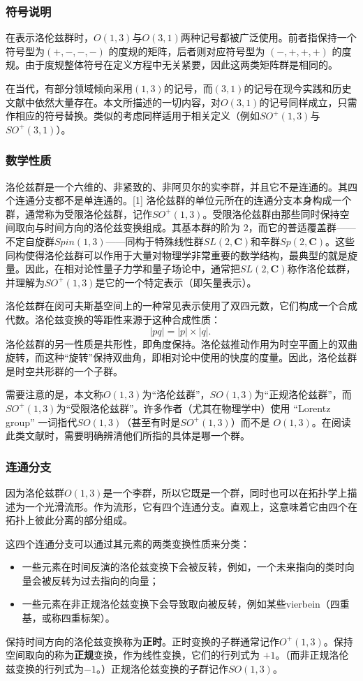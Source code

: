 \subsubsection{符号说明}
在表示洛伦兹群时，$O(1,3)$与$O(3,1)$两种记号都被广泛使用。前者指保持一个符号型为$(+,-,-,-)$ 的度规的矩阵，后者则对应符号型为 $(-,+,+,+)$ 的度规。由于度规整体符号在定义方程中无关紧要，因此这两类矩阵群是相同的。

在当代，有部分领域倾向采用$(1,3)$的记号，而$(3,1)$的记号在现今实践和历史文献中依然大量存在。本文所描述的一切内容，对$O(3,1)$的记号同样成立，只需作相应的符号替换。类似的考虑同样适用于相关定义（例如$SO^{+}(1,3)$与$SO^{+}(3,1)$）。
\subsubsection{数学性质}
洛伦兹群是一个六维的、非紧致的、非阿贝尔的实李群，并且它不是连通的。其四个连通分支都不是单连通的。[1] 洛伦兹群的单位元所在的连通分支本身构成一个群，通常称为受限洛伦兹群，记作$SO^{+}(1,3)$。受限洛伦兹群由那些同时保持空间取向与时间方向的洛伦兹变换组成。其基本群的阶为 2，而它的普适覆盖群——不定自旋群$Spin(1,3)$——同构于特殊线性群$SL(2,\mathbf{C})$和辛群$Sp(2,\mathbf{C})$。这些同构使得洛伦兹群可以作用于大量对物理学非常重要的数学结构，最典型的就是旋量。因此，在相对论性量子力学和量子场论中，通常把$SL(2,\mathbf{C})$称作洛伦兹群，并理解为$SO^{+}(1,3)$是它的一个特定表示（即矢量表示）。

洛伦兹群在闵可夫斯基空间上的一种常见表示使用了双四元数，它们构成一个合成代数。洛伦兹变换的等距性来源于这种合成性质：
\[
|pq| = |p| \times |q|.~
\]
洛伦兹群的另一性质是共形性，即角度保持。洛伦兹推动作用为时空平面上的双曲旋转，而这种“旋转”保持双曲角，即相对论中使用的快度的度量。因此，洛伦兹群是时空共形群的一个子群。

需要注意的是，本文称$O(1,3)$为“洛伦兹群”，$SO(1,3)$为“正规洛伦兹群”，而 $SO^{+}(1,3)$为“受限洛伦兹群”。许多作者（尤其在物理学中）使用 “Lorentz group” 一词指代$SO(1,3)$（甚至有时是$SO^{+}(1,3)$）而不是 $O(1,3)$。在阅读此类文献时，需要明确辨清他们所指的具体是哪一个群。
\subsubsection{连通分支}
因为洛伦兹群$O(1,3)$是一个李群，所以它既是一个群，同时也可以在拓扑学上描述为一个光滑流形。作为流形，它有四个连通分支。直观上，这意味着它由四个在拓扑上彼此分离的部分组成。

这四个连通分支可以通过其元素的两类变换性质来分类：
\begin{itemize}
  \item 一些元素在时间反演的洛伦兹变换下会被反转，例如，一个未来指向的类时向量会被反转为过去指向的向量；
  \item 一些元素在非正规洛伦兹变换下会导致取向被反转，例如某些vierbein（四重基，或称四重标架）。
\end{itemize}
保持时间方向的洛伦兹变换称为\textbf{正时}。正时变换的子群通常记作$O^{+}(1,3)$。保持空间取向的称为\textbf{正规}变换，作为线性变换，它们的行列式为 $+1$。（而非正规洛伦兹变换的行列式为$-1$。）正规洛伦兹变换的子群记作$SO(1,3)$。

